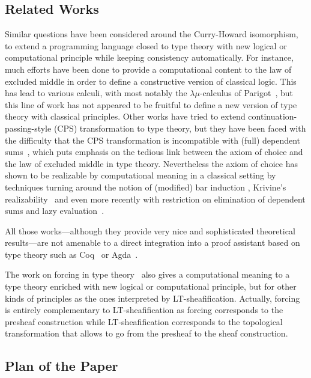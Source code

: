 \documentclass[preprint,9pt,numbers]{sigplanconf}
\begin{document}
\subsection{Related Works}
\label{sec:related-works}

Similar questions have been considered around the Curry-Howard
isomorphism, to extend a programming language closed to type theory
with new logical or computational principle while keeping consistency
automatically.
%
For instance, much efforts have been done to provide a computational
content to the law of excluded middle in order to define a
constructive version of classical logic. This has lead to various
calculi, with most notably the $\lambda \mu$-calculus of
Parigot~\cite{parigot1993classical}, but this line of work has not
appeared to be fruitful to define a new version of type theory with
classical principles.
%
Other works have tried to extend continuation-passing-style (CPS)
transformation to type theory, but they have been faced with the
difficulty that the CPS transformation is incompatible with (full) dependent
sums~\cite{barthe2002cps}, which puts emphasis on the tedious link
between the axiom of choice and the law of excluded middle in type theory.
%
Nevertheless the axiom of choice has shown to be realizable by
computational meaning in a classical setting by techniques turning
around the notion of (modified) bar induction
\cite{berardi1998computational}, Krivine's
realizability~\cite{krivine2003dependent} and even more recently with
restriction on elimination of dependent sums and lazy
evaluation~\cite{herbelin2012constructive}.

All those works---although they provide very nice and sophisticated
theoretical results---are not amenable to a direct integration into a
proof assistant based on type theory such as Coq~\cite{coq:refman:8.4}
or Agda~\cite{norell2007towards}.

The work on forcing in type theory~\cite{jaber2012extending} also
gives a computational meaning to a type theory enriched with new
logical or computational principle, but for other kinds of principles
as the ones interpreted by LT-sheafification.
%
Actually, forcing is entirely complementary to LT-sheafification as
forcing corresponds to the presheaf construction while
LT-sheafification corresponds to the topological transformation that
allows to go from the presheaf to the sheaf construction.    

\subsection{Plan of the Paper}
\end{document}
